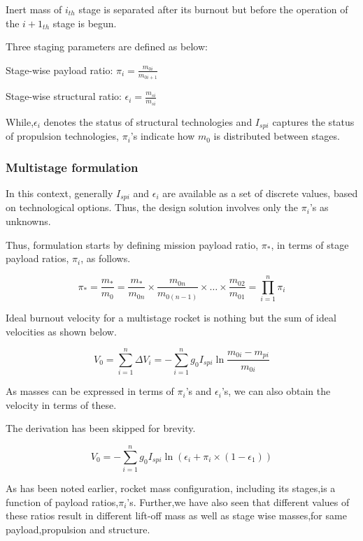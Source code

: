 \documentclass{article}
\theoremstyle{definition}
\begin{document}
Inert mass of $i_{th}$ stage is separated after its burnout but before the operation of the $i+1_{th}$ stage is begun. \medskip

Three staging parameters are defined as below:

Stage-wise payload ratio: $\pi_i = \frac{m_{0i}}{m_{0i+1}}$

Stage-wise structural ratio: $\epsilon_i = \frac{m_{si}}{m_{si}}  $ \medskip

While,$\epsilon_i$ denotes the status of structural technologies and $I_{spi}$ captures the status of propulsion technologies, $\pi_i$'s indicate how $m_0$ is distributed between stages.
 
\subsubsection{Multistage formulation}

In this context, generally $I_{spi}$ and $\epsilon_i$ are available as a set of discrete values, based on technological options.
Thus, the design solution involves only the $\pi_i$'s as unknowns.

Thus, formulation starts by defining mission payload ratio, $\pi_*$, in terms of stage payload ratios, $\pi_i$, as follows.

\begin{equation}
    \pi_*= \frac{m_*}{m_{0}} = \frac{m_*}{m_{0n}} \times \frac{m_{0n}}{m_{0(n-1)}} \times \ldots \times \frac{m_{02}}{m_{01}}  = \prod_{i=1}^n \pi_i
\end{equation}

Ideal burnout velocity for a multistage rocket is nothing but the sum of ideal velocities as shown below.

\begin{equation}
    V_0 = \sum_{i=1}^n \Delta V_i = -\sum_{i=1}^n g_0 I_{spi} \ln{\frac{m_{0i} - m_{pi}}{m_{0i}}}
\end{equation}

As masses can be expressed in terms of $\pi_i$'s and $\epsilon_i$'s, we can also obtain the velocity in terms of these.

The derivation has been skipped for brevity.

\begin{equation}
    V_0 = -\sum_{i=1}^n g_0 I_{spi} \ln{(\epsilon_i + \pi_i\times (1 - \epsilon_1))}
\end{equation}

As has been noted earlier, rocket mass configuration, including its stages,is a function of payload ratios,$\pi_i$'s.
Further,we have also seen that different values of these ratios result in different lift-off mass as well as stage wise masses,for same payload,propulsion and structure.
\end{document}

